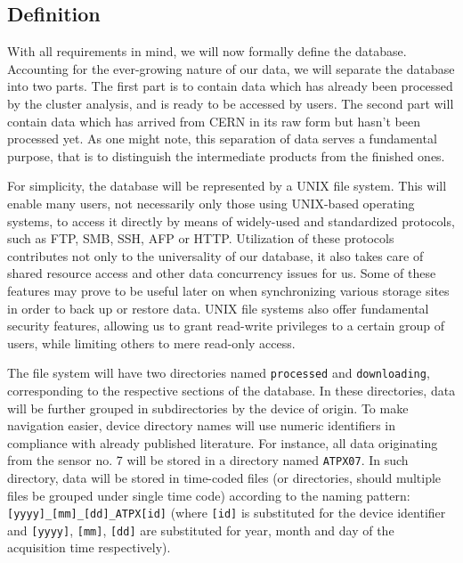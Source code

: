\subsection{Definition}
With all requirements in mind, we will now formally define the database. Accounting for the ever-growing nature of our data, we will separate the database into two parts. The first part is to contain data which has already been processed by the cluster analysis, and is ready to be accessed by users. The second part will contain data which has arrived from CERN in its raw form but hasn't been processed yet. As one might note, this separation of data serves a fundamental purpose, that is to distinguish the intermediate products from the finished ones.


For simplicity, the database will be represented by a UNIX file system. This will enable many users, not necessarily only those using UNIX-based operating systems, to access it directly by means of widely-used and standardized protocols, such as FTP, SMB, SSH, AFP or HTTP. Utilization of these protocols contributes not only to the universality of our database, it also takes care of shared resource access and other data concurrency issues for us. Some of these features may prove to be useful later on when synchronizing various storage sites in order to back up or restore data. UNIX file systems also offer fundamental security features, allowing us to grant read-write privileges to a certain group of users, while limiting others to mere read-only access.


The file system will have two directories named \texttt{processed} and \texttt{downloading}, corresponding to the respective sections of the database. In these directories, data will be further grouped in subdirectories by the device of origin. To make navigation easier, device directory names will use numeric identifiers in compliance with already published literature. For instance, all data originating from the sensor no. 7 will be stored in a directory named \texttt{ATPX07}. In such directory, data will be stored in time-coded files (or directories, should multiple files be grouped under single time code) according to the naming pattern: \texttt{[yyyy]\_[mm]\_[dd]\_ATPX[id]} (where \texttt{[id]} is substituted for the device identifier and \texttt{[yyyy]}, \texttt{[mm]}, \texttt{[dd]} are substituted for year, month and day of the acquisition time respectively).

